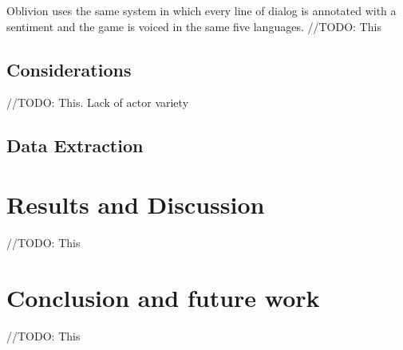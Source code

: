 \documentclass[journal]{IEEEtran}
\begin{document}
Oblivion uses the same system in which every line of dialog is annotated with a sentiment
and the game is voiced in the same five languages.
//TODO: This
\subsection{Considerations}
//TODO: This. Lack of actor variety

\subsection{Data Extraction}

\section{Results and Discussion}
//TODO: This

\section{Conclusion and future work}
//TODO: This





\end{document}
